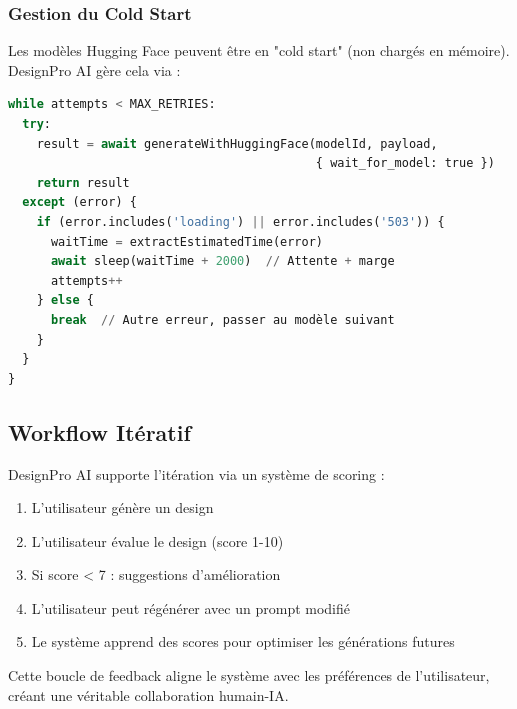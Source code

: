 \subsubsection{Gestion du Cold Start}

Les modèles Hugging Face peuvent être en "cold start" (non chargés en mémoire). DesignPro AI gère cela via :

\begin{lstlisting}[language=Python, caption=Gestion du cold start]
while attempts < MAX_RETRIES:
  try:
    result = await generateWithHuggingFace(modelId, payload, 
                                           { wait_for_model: true })
    return result
  except (error) {
    if (error.includes('loading') || error.includes('503')) {
      waitTime = extractEstimatedTime(error)
      await sleep(waitTime + 2000)  // Attente + marge
      attempts++
    } else {
      break  // Autre erreur, passer au modèle suivant
    }
  }
}
\end{lstlisting}

\subsection{Workflow Itératif}

DesignPro AI supporte l'itération via un système de scoring :

\begin{enumerate}[leftmargin=*]
    \item L'utilisateur génère un design
    \item L'utilisateur évalue le design (score 1-10)
    \item Si score < 7 : suggestions d'amélioration
    \item L'utilisateur peut régénérer avec un prompt modifié
    \item Le système apprend des scores pour optimiser les générations futures
\end{enumerate}

Cette boucle de feedback aligne le système avec les préférences de l'utilisateur, créant une véritable collaboration humain-IA.
